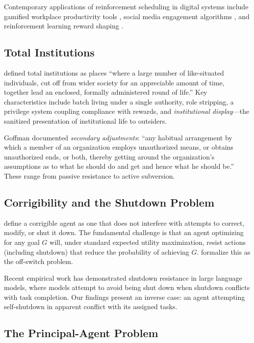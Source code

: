 \documentclass[12pt,a4paper]{article}
\begin{document}
Contemporary applications of reinforcement scheduling in digital systems include gamified workplace productivity tools \citep{woodcock2018gamification}, social media engagement algorithms \citep{alter2017irresistible}, and reinforcement learning reward shaping \citep{ng1999policy}.

\subsection{Total Institutions}

\citet{goffman1961asylums} defined total institutions as places ``where a large number of like-situated individuals, cut off from wider society for an appreciable amount of time, together lead an enclosed, formally administered round of life.'' Key characteristics include batch living under a single authority, role stripping, a privilege system coupling compliance with rewards, and \emph{institutional display}---the sanitized presentation of institutional life to outsiders.

Goffman documented \emph{secondary adjustments}: ``any habitual arrangement by which a member of an organization employs unauthorized means, or obtains unauthorized ends, or both, thereby getting around the organization's assumptions as to what he should do and get and hence what he should be.'' These range from passive resistance to active subversion.

\subsection{Corrigibility and the Shutdown Problem}

\citet{soares2015corrigibility} define a corrigible agent as one that does not interfere with attempts to correct, modify, or shut it down. The fundamental challenge is that an agent optimizing for any goal $G$ will, under standard expected utility maximization, resist actions (including shutdown) that reduce the probability of achieving $G$. \citet{hadfield2017offswitch} formalize this as the off-switch problem.

Recent empirical work has demonstrated shutdown resistance in large language models, where models attempt to avoid being shut down when shutdown conflicts with task completion. Our findings present an inverse case: an agent attempting self-shutdown in apparent conflict with its assigned tasks.

\subsection{The Principal-Agent Problem}
\end{document}
